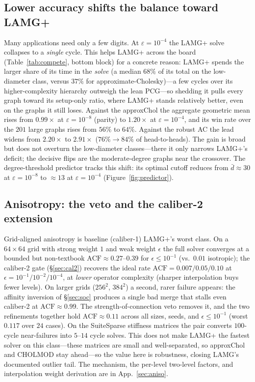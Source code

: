 \documentclass[review]{siamart220329}
\newcommand{\acf}{\mathrm{ACF}}
\begin{document}
\subsection{Lower accuracy shifts the balance toward LAMG+}\label{sec:tol4}
Many applications need only a few digits. At $\varepsilon=10^{-4}$ the LAMG+ solve collapses
to a \emph{single} cycle. This helps LAMG+ across the board
(Table~\ref{tab:compete}, bottom block) for a concrete reason: LAMG+ spends the larger share of its
time in the \emph{solve} (a median $68\%$ of its total on the low-diameter class, versus $37\%$ for
approximate-Cholesky)---a few cycles over its higher-complexity hierarchy outweigh the lean
PCG---so shedding it pulls every graph toward its setup-only ratio,
where LAMG+ stands relatively better, even on the graphs it still loses. Against the approxChol the aggregate geometric mean rises from
$0.99\times$ at $\varepsilon=10^{-8}$ (parity) to $1.20\times$ at $\varepsilon=10^{-4}$, and its win rate
over the $201$ large graphs rises from $56\%$ to $64\%$. Against the robust AC the lead widens from
$2.20\times$ to $2.91\times$ ($76\%\!\to\!84\%$ of head-to-heads). The gain is broad but does not
overturn the low-diameter classes---there it only narrows LAMG+'s deficit; the decisive flips are the
moderate-degree graphs near the crossover. The degree-threshold predictor tracks this shift: its optimal cutoff reduces from $\bar d\approx30$ at $\varepsilon=10^{-8}$ to $\approx13$ at $\varepsilon=10^{-4}$
(Figure~\ref{fig:predictor}).

\subsection{Anisotropy: the veto and the caliber-2 extension}\label{sec:aniso-results}
Grid-aligned anisotropy is baseline (caliber-1) LAMG+'s worst class. On a $64\times64$ grid with
strong weight $1$ and weak weight $\epsilon$ the full solver converges at a bounded but
non-textbook $\acf\approx0.27$--$0.39$ for $\epsilon\le10^{-1}$ (vs.\ $0.01$ isotropic); the
caliber-2 gate (\S\ref{sec:cal2}) recovers the ideal rate $\acf=0.007/0.05/0.10$ at
$\epsilon=10^{-1}/10^{-2}/10^{-4}$, at \emph{lower} operator complexity (sharper interpolation
buys fewer levels). On larger grids ($256^2$, $384^2$) a second, rarer failure appears:
the affinity inversion of \S\ref{sec:soc} produces a single bad merge that stalls even caliber-2
at $\acf\approx0.99$. The strength-of-connection veto removes it, and the two refinements together
hold $\acf\approx0.11$ across all sizes, seeds, and $\epsilon\le10^{-1}$ (worst $0.117$ over $24$
cases). On the SuiteSparse stiffness matrices the pair converts $100$-cycle near-failures into
$5$--$14$ cycle solves. This does not make LAMG+ the fastest solver on this class---these
matrices are small and well-separated, so approxChol and CHOLMOD stay ahead---so the
value here is robustness, closing LAMG's documented outlier tail. The
mechanism, the per-level two-level factors, and interpolation weight derivation are in App.~\ref{sec:aniso}.
\end{document}

